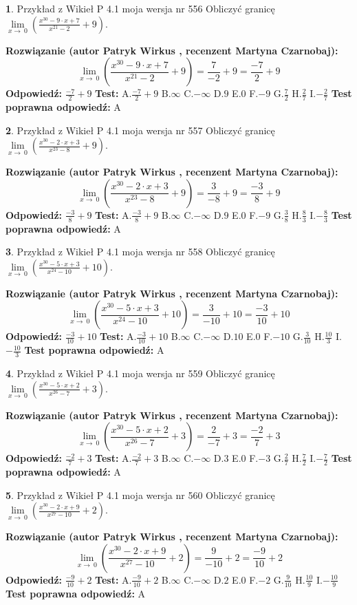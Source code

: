 \documentclass[12pt, a4paper]{article}
\theoremstyle{definition} %
\newtheorem{zad}{}
\newcommand{\zadStart}[1]{\begin{zad}#1\newline}
\newcommand{\zadStop}{\end{zad}}
\newcommand{\rozwStart}[2]{\noindent \textbf{Rozwiązanie (autor #1 , recenzent #2): }\newline}
\newcommand{\rozwStop}{\newline}
\newcommand{\odpStart}{\noindent \textbf{Odpowiedź:}\newline}
\newcommand{\odpStop}{\newline}
\newcommand{\testStart}{\noindent \textbf{Test:}\newline}
\newcommand{\testStop}{\newline}
\newcommand{\kluczStart}{\noindent \textbf{Test poprawna odpowiedź:}\newline}
\newcommand{\kluczStop}{\newline}
\begin{document}
\zadStart{Przykład z Wikieł P 4.1 moja wersja nr 556}
Obliczyć granicę $\lim\limits_{x\to\ 0}(\frac{x^{30}-9 \cdot x +7}{x^{21}-2}+9)$.
\zadStop
\rozwStart{Patryk Wirkus}{Martyna Czarnobaj}
$$\lim\limits_{x\to\ 0}(\frac{x^{30}-9 \cdot x +7}{x^{21}-2}+9)=\frac{7}{-2}+9=\frac{-7}{2}+9$$
\rozwStop
\odpStart
$\frac{-7}{2}+9$
\odpStop
\testStart
A.$\frac{-7}{2}+9$
B.$\infty$
C.$-\infty$
D.$9$
E.$0$
F.$-9$
G.$\frac{7}{2}$
H.$\frac{2}{7}$
I.$-\frac{2}{7}$
\testStop
\kluczStart
A
\kluczStop



\zadStart{Przykład z Wikieł P 4.1 moja wersja nr 557}
Obliczyć granicę $\lim\limits_{x\to\ 0}(\frac{x^{30}-2 \cdot x +3}{x^{23}-8}+9)$.
\zadStop
\rozwStart{Patryk Wirkus}{Martyna Czarnobaj}
$$\lim\limits_{x\to\ 0}(\frac{x^{30}-2 \cdot x +3}{x^{23}-8}+9)=\frac{3}{-8}+9=\frac{-3}{8}+9$$
\rozwStop
\odpStart
$\frac{-3}{8}+9$
\odpStop
\testStart
A.$\frac{-3}{8}+9$
B.$\infty$
C.$-\infty$
D.$9$
E.$0$
F.$-9$
G.$\frac{3}{8}$
H.$\frac{8}{3}$
I.$-\frac{8}{3}$
\testStop
\kluczStart
A
\kluczStop



\zadStart{Przykład z Wikieł P 4.1 moja wersja nr 558}
Obliczyć granicę $\lim\limits_{x\to\ 0}(\frac{x^{30}-5 \cdot x +3}{x^{24}-10}+10)$.
\zadStop
\rozwStart{Patryk Wirkus}{Martyna Czarnobaj}
$$\lim\limits_{x\to\ 0}(\frac{x^{30}-5 \cdot x +3}{x^{24}-10}+10)=\frac{3}{-10}+10=\frac{-3}{10}+10$$
\rozwStop
\odpStart
$\frac{-3}{10}+10$
\odpStop
\testStart
A.$\frac{-3}{10}+10$
B.$\infty$
C.$-\infty$
D.$10$
E.$0$
F.$-10$
G.$\frac{3}{10}$
H.$\frac{10}{3}$
I.$-\frac{10}{3}$
\testStop
\kluczStart
A
\kluczStop



\zadStart{Przykład z Wikieł P 4.1 moja wersja nr 559}
Obliczyć granicę $\lim\limits_{x\to\ 0}(\frac{x^{30}-5 \cdot x +2}{x^{26}-7}+3)$.
\zadStop
\rozwStart{Patryk Wirkus}{Martyna Czarnobaj}
$$\lim\limits_{x\to\ 0}(\frac{x^{30}-5 \cdot x +2}{x^{26}-7}+3)=\frac{2}{-7}+3=\frac{-2}{7}+3$$
\rozwStop
\odpStart
$\frac{-2}{7}+3$
\odpStop
\testStart
A.$\frac{-2}{7}+3$
B.$\infty$
C.$-\infty$
D.$3$
E.$0$
F.$-3$
G.$\frac{2}{7}$
H.$\frac{7}{2}$
I.$-\frac{7}{2}$
\testStop
\kluczStart
A
\kluczStop



\zadStart{Przykład z Wikieł P 4.1 moja wersja nr 560}
Obliczyć granicę $\lim\limits_{x\to\ 0}(\frac{x^{30}-2 \cdot x +9}{x^{27}-10}+2)$.
\zadStop
\rozwStart{Patryk Wirkus}{Martyna Czarnobaj}
$$\lim\limits_{x\to\ 0}(\frac{x^{30}-2 \cdot x +9}{x^{27}-10}+2)=\frac{9}{-10}+2=\frac{-9}{10}+2$$
\rozwStop
\odpStart
$\frac{-9}{10}+2$
\odpStop
\testStart
A.$\frac{-9}{10}+2$
B.$\infty$
C.$-\infty$
D.$2$
E.$0$
F.$-2$
G.$\frac{9}{10}$
H.$\frac{10}{9}$
I.$-\frac{10}{9}$
\testStop
\kluczStart
A
\kluczStop
\end{document}

